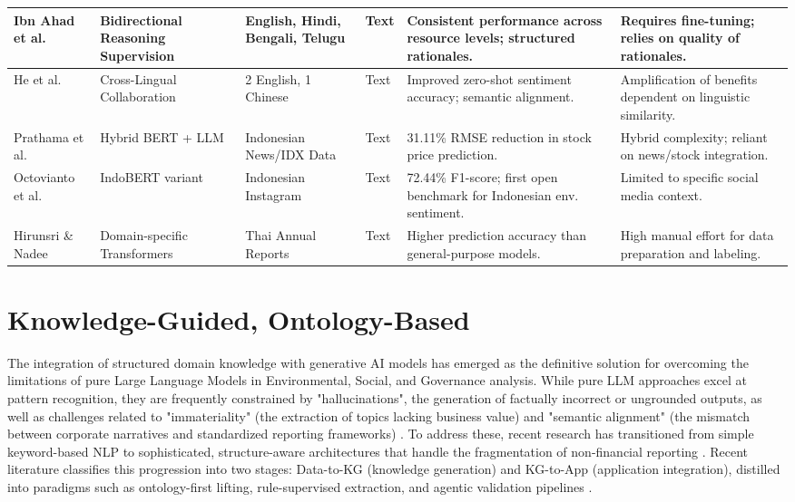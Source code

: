 \documentclass[english, online, cse, master]{dithesis}
\begin{document}
\begin{landscape}
\begin{table}[p]
\begin{tabularx}{\linewidth}{|p{1.8cm}|p{3cm}|p{3cm}|p{1.8cm}|X|X|}
Ibn Ahad et al.  \parencite{association_for_computational_linguistics_2025_1ba46dee} & Bidirectional Reasoning Supervision & English, Hindi, Bengali, Telugu & Text & Consistent performance across resource levels; structured rationales. & Requires fine-tuning; relies on quality of rationales. \\ \hline
He et al.  \parencite{association_for_computational_linguistics_2025_5a25f994} & Cross-Lingual Collaboration & 2 English, 1 Chinese & Text & Improved zero-shot sentiment accuracy; semantic alignment. & Amplification of benefits dependent on linguistic similarity. \\ \hline
Prathama et al.  \parencite{ubaidillah_ariq_prathama_a1856e2f} & Hybrid BERT + LLM & Indonesian News/IDX Data & Text & 31.11\% RMSE reduction in stock price prediction. & Hybrid complexity; reliant on news/stock integration. \\ \hline
Octovianto et al.  \parencite{christofer_octovianto_487e90aa} & IndoBERT variant & Indonesian Instagram & Text & 72.44\% F1-score; first open benchmark for Indonesian env. sentiment. & Limited to specific social media context. \\ \hline
Hirunsri \& Nadee  \parencite{tharnsaithong_hirunsri_e4c4d75b} & Domain-specific Transformers & Thai Annual Reports & Text & Higher prediction accuracy than general-purpose models. & High manual effort for data preparation and labeling. \\ \hline
\end{tabularx}
\end{table}
\end{landscape}

\section{Knowledge-Guided, Ontology-Based}

The integration of structured domain knowledge with generative AI models has emerged as the definitive solution for overcoming the limitations of pure Large Language Models in Environmental, Social, and Governance analysis. While pure LLM approaches excel at pattern recognition, they are frequently constrained by "hallucinations", the generation of factually incorrect or ungrounded outputs, as well as challenges related to "immateriality" (the extraction of topics lacking business value) and "semantic alignment" (the mismatch between corporate narratives and standardized reporting frameworks)  \parencite[]{arash_hajikhani_cbb2528f, keane_ong_8fec4760}. To address these, recent research has transitioned from simple keyword-based NLP to sophisticated, structure-aware architectures that handle the fragmentation of non-financial reporting  \parencite[]{annas_vijaya_dc57c7ec, chaoyue_he_8c389604}. Recent literature classifies this progression into two stages: Data-to-KG (knowledge generation) and KG-to-App (application integration), distilled into paradigms such as ontology-first lifting, rule-supervised extraction, and agentic validation pipelines  \parencite{chaoyue_he_8c389604}.
\end{document}
